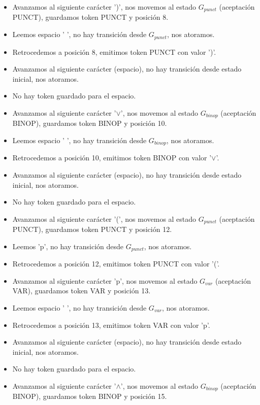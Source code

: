 \begin{enumerate}
\begin{itemize}
        \item Avanzamos al siguiente carácter ')', nos movemos al estado $G_{punct}$ (aceptación PUNCT), guardamos token PUNCT y posición 8.
        \item Leemos espacio ' ', no hay transición desde $G_{punct}$, nos atoramos.
        \item Retrocedemos a posición 8, emitimos token PUNCT con valor ')'.
        \item Avanzamos al siguiente carácter (espacio), no hay transición desde estado inicial, nos atoramos.
        \item No hay token guardado para el espacio.
        \item Avanzamos al siguiente carácter '$\lor$', nos movemos al estado $G_{binop}$ (aceptación BINOP), guardamos token BINOP y posición 10.
        \item Leemos espacio ' ', no hay transición desde $G_{binop}$, nos atoramos.
        \item Retrocedemos a posición 10, emitimos token BINOP con valor '$\lor$'.
        \item Avanzamos al siguiente carácter (espacio), no hay transición desde estado inicial, nos atoramos.
        \item No hay token guardado para el espacio.
        \item Avanzamos al siguiente carácter '(', nos movemos al estado $G_{punct}$ (aceptación PUNCT), guardamos token PUNCT y posición 12.
        \item Leemos 'p', no hay transición desde $G_{punct}$, nos atoramos.
        \item Retrocedemos a posición 12, emitimos token PUNCT con valor '('.
        \item Avanzamos al siguiente carácter 'p', nos movemos al estado $G_{var}$ (aceptación VAR), guardamos token VAR y posición 13.
        \item Leemos espacio ' ', no hay transición desde $G_{var}$, nos atoramos.
        \item Retrocedemos a posición 13, emitimos token VAR con valor 'p'.
        \item Avanzamos al siguiente carácter (espacio), no hay transición desde estado inicial, nos atoramos.
        \item No hay token guardado para el espacio.
        \item Avanzamos al siguiente carácter '$\land$', nos movemos al estado $G_{binop}$ (aceptación BINOP), guardamos token BINOP y posición 15.

\end{itemize}
\end{enumerate}
